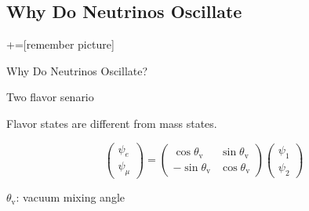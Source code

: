 
\subsection{Why Do Neutrinos Oscillate}

+=[remember picture]

\everymath{\displaystyle}


\begin{frame}{Why Do Neutrinos Oscillate?}

\begin{tcolorbox}[box align=center,halign=center,valign=center, standard jigsaw,opacityback=0, coltext=white]
Two flavor senario
\end{tcolorbox}

Flavor states are different from mass states.

\begin{equation*}
\begin{pmatrix}
\psi_e\\
\psi_\mu
\end{pmatrix} = \begin{pmatrix}
\cos \theta_{\mathrm v} & \sin\theta_{\mathrm v} \\
-\sin \theta_{\mathrm v} & \cos \theta_{\mathrm v}
\end{pmatrix}\begin{pmatrix}
\psi_1\\
\psi_2
\end{pmatrix}
\end{equation*}


$\theta_{\mathrm v}$: vacuum mixing angle

\end{frame}




